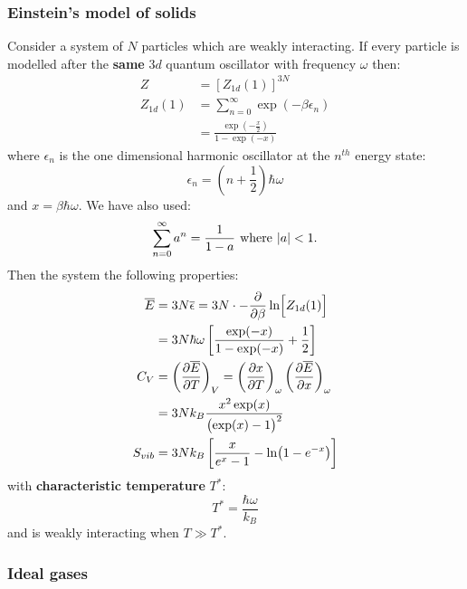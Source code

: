 \documentclass{article}
\begin{document}
\begin{multicols*}{3}
\subsubsection*{Einstein's model of solids}
Consider a system of $N$ particles which are weakly interacting.
If every particle is modelled after the \textbf{same}
$3d$ quantum oscillator with frequency $\omega$ then:
\begin{align*}
    Z &= [Z_{1d}(1)]^{3N} \\
    Z_{1d}(1) 
    &=\sum_{n=0}^{\infty}\exp(-\beta\epsilon_n) \\
    &=\frac{\exp(-\frac{x}{2})}{1-\exp(-x)}
\end{align*}
where $\epsilon_n$ is the one dimensional harmonic oscillator
at the $n^{th}$ energy state:
$$\epsilon_n=\left(n+\frac{1}{2}\right)\hbar\omega$$
and $x=\beta\hbar\omega$. We have also used:
$$\sum_{n=0}^{\infty}a^n=\frac{1}{1-a}
\hspace*{0.05in}\text{where}\hspace*{0.05in}|a|<1.$$
Then the system the following properties:
\begin{align*}
    \overline{E} &=3N\overline{\epsilon}
    =3N\cdot-\frac{\partial}{\partial\beta}\ln\Bigl[
    Z_{1d}(1)\Bigr] \\
    &=3N\hbar\omega\left[\frac{\exp(-x)}
    {1-\exp(-x)}+\frac{1}{2}\right] \\
    C_V &=\left(\frac{\partial\overline{E}}{\partial T}\right)_V
    =\left(\frac{\partial x}{\partial T}\right)_{\omega}
    \left(\frac{\partial\overline{E}}{\partial x}\right)_{\omega} \\
    &=3Nk_B\frac{x^2\exp(x)}{\bigl(\exp(x)-1\bigr)^2} \\
    S_{vib} &=3Nk_B\left[\frac{x}{e^x-1}-\ln(1-e^{-x})\right]
\end{align*}
with \textbf{characteristic temperature} $T^*$:
$$T^*=\frac{\hbar\omega}{k_B}$$
and is weakly interacting when $T\gg T^*$.

\subsubsection*{Ideal gases}

\end{multicols*}
\end{document}
